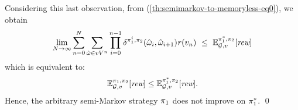 \begin{myproof}

  Considering this last observation, from
  (\ref{th:semimarkov-to-memoryless-eq0}), we obtain
  \[
  \lim_{N \rightarrow \infty}	\sum^{N}_{n=0}\sum_{\hat{\omega} \in vV^{n}} \prod^{n-1}_{i=0}\delta^{\strat{1}^i,\strat{2}}(\hat{\omega}_i, \hat{\omega}_{i+1}) \reward(v_n) \ \leq \ \Expect{\starredstrat{1}}{\strat{2}}_{\StochG,v}[\Rewards]
  \]
  which  is equivalent to:
  \[
  \mathbb{E}^{\pi_{1}, \pi_{2}}_{\mathcal{G},v}[\textit{rew}] \leq \mathbb{E}^{\pi^*_{1}, \pi_{2}}_{\mathcal{G},v}[\textit{rew}].
  \]
  Hence, the arbitrary semi-Markov strategy $\pi_{1}$ does not improve on $\pi^*_{1}$.
  \qed
\end{myproof}
\fi

